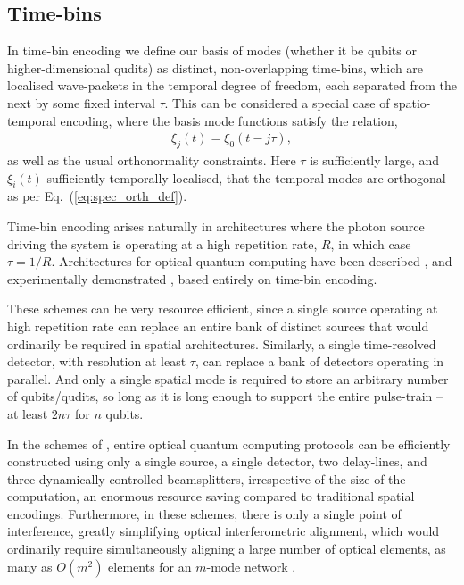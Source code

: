 \documentclass[aps,rmp,twocolumn,amsmath,amssymb,nofootinbib,superscriptaddress,longbibliography,floatfix,table-of-contents,eqsecnum]{revtex4-1}
\begin{document}
%
%

\subsection{Time-bins} \label{sec:time_bin} 

In time-bin encoding we define our basis of modes (whether it be qubits or higher-dimensional qudits) as distinct, non-overlapping time-bins, which are localised wave-packets in the temporal degree of freedom, each separated from the next by some fixed interval $\tau$. This can be considered a special case of spatio-temporal encoding, where the basis mode functions satisfy the relation,
\begin{align}
\xi_{j}(t) = \xi_0(t-j\tau),
\end{align}
as well as the usual orthonormality constraints. Here $\tau$ is sufficiently large, and $\xi_i(t)$ sufficiently temporally localised, that the temporal modes are orthogonal as per Eq.~(\ref{eq:spec_orth_def}).

Time-bin encoding arises naturally in architectures where the photon source driving the system is operating at a high repetition rate, $R$, in which case \mbox{$\tau=1/R$}. Architectures for optical quantum computing have been described \cite{bib:RohdeLoop15, bib:RohdeUnivLoop15}, and experimentally demonstrated \cite{???}, based entirely on time-bin encoding.

These schemes can be very resource efficient, since a single source operating at high repetition rate can replace an entire bank of distinct sources that would ordinarily be required in spatial architectures. Similarly, a single time-resolved detector, with resolution at least $\tau$, can replace a bank of detectors operating in parallel. And only a single spatial mode is required to store an arbitrary number of qubits/qudits, so long as it is long enough to support the entire pulse-train -- at least $2n\tau$ for $n$ qubits.

In the schemes of \cite{bib:RohdeLoop15, bib:RohdeUnivLoop15}, entire optical quantum computing protocols can be efficiently constructed using only a single source, a single detector, two delay-lines, and three dynamically-controlled beamsplitters, irrespective of the size of the computation, an enormous resource saving compared to traditional spatial encodings. Furthermore, in these schemes, there is only a single point of interference, greatly simplifying optical interferometric alignment, which would ordinarily require simultaneously aligning a large number of optical elements, as many as $O(m^2)$ elements for an $m$-mode network \cite{bib:Reck94}.
\end{document}
